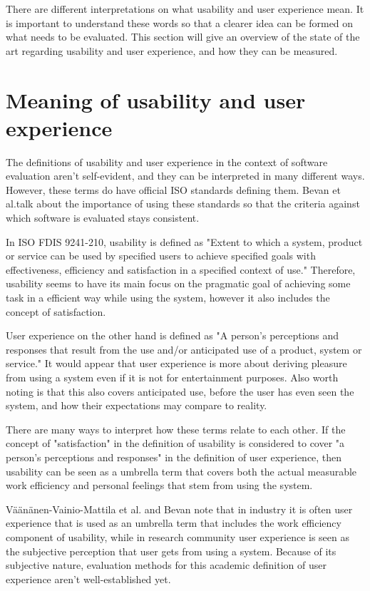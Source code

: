 There are different interpretations on what usability and user experience mean. It is important to understand these words so that a clearer idea can be formed on what needs to be evaluated. This section will give an overview of the state of the art regarding usability and user experience, and how they can be measured.

\section{Meaning of usability and user experience} \label{definitions_section}
The definitions of usability and user experience in the context of software evaluation aren't self-evident, and they can be interpreted in many different ways. However, these terms do have official ISO standards defining them. Bevan et al.talk about the importance of using these standards so that the criteria against which software is evaluated stays consistent. \cite{bevanstandard}

In  ISO FDIS 9241-210, usability is defined as "Extent to which  a system, product or service can be used by specified users to achieve specified goals with effectiveness, efficiency and satisfaction in a specified context of use." Therefore, usability seems to have its main focus on the pragmatic goal of achieving some task in a efficient way while using the system, however it also includes the concept of satisfaction.

User experience on the other hand is defined as "A person's perceptions and responses that result from the use and/or anticipated use of a product, system or service." It would appear that user experience is more about deriving pleasure from using a system even if it is not for entertainment purposes. Also worth noting is that this also covers anticipated use, before the user has even seen the system, and how their expectations may compare to reality.

There are many ways to interpret how these terms relate to each other. If the concept of "satisfaction" in the definition of usability is considered to cover "a person's perceptions and responses" in the definition of user experience, then usability can be seen as a umbrella term that covers both the actual measurable work efficiency and personal feelings that stem from using the system.

Väänänen-Vainio-Mattila et al. and Bevan note that in industry it is often user experience that is used as an umbrella term that includes the work efficiency component of usability, while in research community user experience is seen as the subjective perception that user gets from using a system. Because of its subjective nature, evaluation methods for this academic definition of user experience aren't well-established yet. \cite{bevan2009difference, vaananen2008towards}

